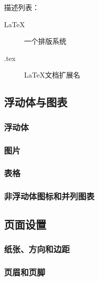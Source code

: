 \documentclass{ctexart}
\begin{document}
            描述列表：
            \begin{description}
                \item[LaTeX] 一个排版系统
                \item[.tex] LaTeX文档扩展名  
            \end{description}

    \subsection{浮动体与图表}

        \subsubsection{浮动体}

        \subsubsection{图片}

        \subsubsection{表格}

        \subsubsection{非浮动体图标和并列图表}

    \subsection{页面设置}
        \subsubsection{纸张、方向和边距}

        \subsubsection{页眉和页脚}
\end{document}
